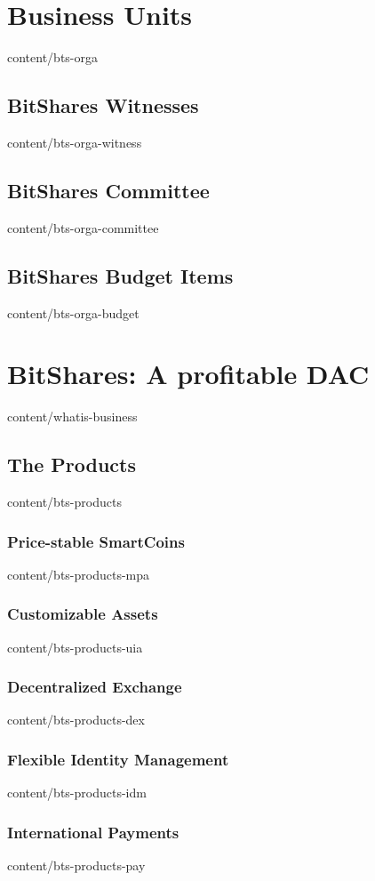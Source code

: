 \documentclass{btswhitepaper}
\begin{document}
\section       { Business Units                    }  { content/bts-orga            }
\subsection    { BitShares Witnesses               }  { content/bts-orga-witness    }
\subsection    { BitShares Committee               }  { content/bts-orga-committee  }
\subsection    { BitShares Budget Items            }  { content/bts-orga-budget     }

\section       { BitShares: A profitable DAC       }  { content/whatis-business     } 
\subsection    { The Products                      }  { content/bts-products        }
\subsubsection { Price-stable SmartCoins           }  { content/bts-products-mpa    }
\subsubsection { Customizable Assets               }  { content/bts-products-uia    }
\subsubsection { Decentralized Exchange            }  { content/bts-products-dex    }
\subsubsection { Flexible Identity Management      }  { content/bts-products-idm    }
\subsubsection { International Payments            }  { content/bts-products-pay    }
\end{document}
